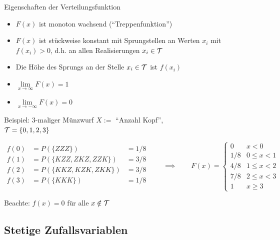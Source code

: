 \documentclass[
  10pt,
  ignorenonframetext,
]{beamer}
\providecommand{\tightlist}{%
  \setlength{\itemsep}{0pt}\setlength{\parskip}{0pt}}
\begin{document}
\begin{frame}{Eigenschaften der Verteilungsfunktion}
\protect\hypertarget{eigenschaften-der-verteilungsfunktion}{}
\begin{itemize}
\tightlist
\item
  \(F(x)\) ist monoton wachsend (``Treppenfunktion'')
\item
  \(F(x)\) ist stückweise konstant mit Sprungstellen an Werten \(x_i\)
  mit \(f(x_i) > 0\), d.h. an allen Realisierungen \(x_i \in {\cal{T}}\)
\item
  Die Höhe des Sprungs an der Stelle \(x_i \in {\cal{T}}\) ist
  \(f(x_i)\)
\item
  \(\lim\limits_{x \to \infty} F(x) = 1\)
\item
  \(\lim\limits_{x \to -\infty} F(x) = 0\)
\end{itemize}
\end{frame}

\begin{frame}{Beispiel: 3-maliger Münzwurf}
\protect\hypertarget{beispiel-3-maliger-muxfcnzwurf}{}
\(X :=\) ``Anzahl Kopf'',\\
\({\cal{T}}=\{0,1,2,3\}\)

\[\begin{array}{lll}
f(0) &= P(\{ZZZ\}) &= 1/8\\
f(1) &= P(\{KZZ, ZKZ, ZZK\}) &= 3/8\\
f(2) &= P(\{KKZ, KZK, ZKK\}) &= 3/8\\
f(3) &= P(\{KKK\}) &= 1/8\\
\end{array}
\qquad
\implies
\qquad
F(x) = \begin{cases}
0 & x < 0 \\
1/8 & 0 \leq x < 1\\
4/8 & 1 \leq x < 2\\
7/8 & 2 \leq x < 3\\
1 & x \geq 3
\end{cases}\]

Beachte: \(f(x)=0\) für alle \(x \notin {\cal{T}}\)
\end{frame}

\hypertarget{stetige-zufallsvariablen}{%
\subsection{Stetige Zufallsvariablen}\label{stetige-zufallsvariablen}}
\end{document}
